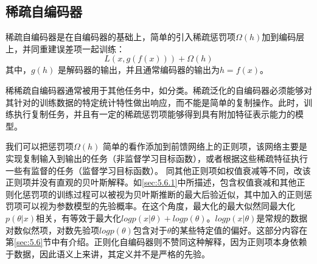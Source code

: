 \subsection{稀疏自编码器}
\label{sec:14.2.1}
稀疏自编码器是在自编码器的基础上，简单的引入稀疏惩罚项$\Omega(h)$加到编码层上，并同重建误差项一起训练：
\begin{equation}
L(x,g(f(x))) + \Omega(h) 
\end{equation}
其中，$g(h)$ 是解码器的输出，并且通常编码器的输出为$h = f(x)$。

稀稀疏自编码器通常被用于其他任务中，如分类。稀疏泛化的自编码器必须能够对其针对的训练数据的特定统计特性做出响应，而不能是简单的复制操作。此时，训练执行复制任务，并且有一定的稀疏惩罚项能够得到具有附加特征表示能力的模型。

我们可以把惩罚项$\Omega(h)$ 简单的看作添加到前馈网络上的正则项，该网络主要是实现复制输入到输出的任务（非监督学习目标函数），或者根据这些稀疏特征执行一些有监督的任务（监督学习目标函数）。
同其他正则项如权值衰减等不同，改该正则项并没有直观的贝叶斯解释。如\ref{sec:5.6.1}中所描述，包含权值衰减和其他正则化惩罚项的训练过程可以被视为贝叶斯推断的最大后验近似，其中加入的正则惩罚项可以视为参数模型的先验概率。在这个角度，最大化的最大似然同最大化$p(\theta|x)$相关，有等效于最大化$log p(x|\theta) + log p(\theta)$。$log p(x|\theta)$是常规的数据对数似然项，对数先验项$log p(\theta)$包含对于$\theta$的某些特定值的偏好。这部分内容在第\ref{sec:5.6}节中有介绍。正则化自编码器则不赞同这种解释，因为正则项本身依赖于数据，因此语义上来讲，其定义并不是严格的先验。

